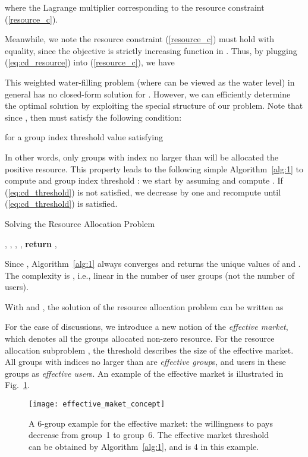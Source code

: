 \documentclass[twocolumn,10pt,twosided]{IEEEtran}
\begin{document}
where   the Lagrange multiplier corresponding to the resource constraint (\ref{resource_c}).

Meanwhile, we note the resource constraint (\ref{resource_c}) must hold with
equality, since the objective is strictly increasing function in . Thus, by plugging (\ref{eq:cd_resource}) into (\ref{resource_c}), we have

This weighted water-filling problem (where  can be viewed as the water level) in general has no closed-form solution  for . However, we can efficiently determine the optimal solution  by exploiting the special structure of our problem. Note that since , then  must satisfy  the following condition:


for a group index threshold value  satisfying

In other words, only groups with index no larger than  will be allocated the positive resource.
This property leads to the following simple Algorithm~\ref{alg:1} to compute  and group index threshold : we start by assuming  and compute . If (\ref{eq:cd_threshold}) is not satisfied, we decrease  by one and recompute  until (\ref{eq:cd_threshold}) is satisfied.
\begin{algorithm}\caption{Solving the Resource Allocation Problem }     \label{alg:1}
\begin{algorithmic}[1]
 \Function {} {, }
    \State ,  
    \While {}
        \State ,  
    \EndWhile
    \State , 
\State \textbf{return} , 
\EndFunction
\end{algorithmic}                       \end{algorithm}

Since , Algorithm~\ref{alg:1} always converges and returns the unique values of  and . The complexity is , i.e., linear in the number of user groups (not the number of users).

With  and , the solution of the resource allocation problem can be written as

For the ease of discussions, we introduce a new notion of the \emph{effective market}, which denotes all the groups allocated non-zero resource. For the resource allocation subproblem , the threshold  describes the size of the effective market. All groups with indices no larger than  are \emph{effective group}s, and users in these groups as \emph{effective user}s. An example of the effective market is illustrated in Fig.~\ref{fig:effective_market_concept}.
\begin{figure}[hbt]
\centering
  \texttt{[image: effective\_maket\_concept]}
  \caption{A 6-group example for the effective market:  the willingness to pays decrease from group~1 to group~6. The effective market threshold can be obtained by Algorithm~\ref{alg:1}, and is 4 in this example.}
  \label{fig:effective_market_concept}
\end{figure}
\end{document}
